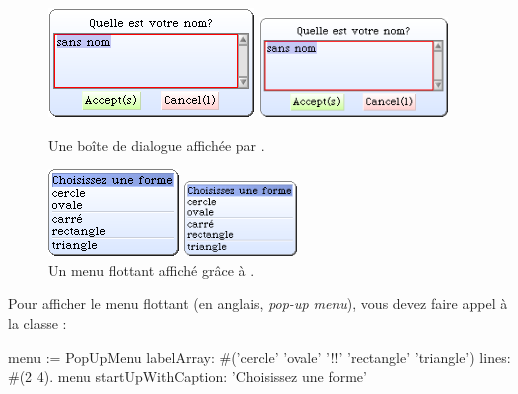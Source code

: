 \documentclass[a4paper,10pt,twoside]{book}
\begin{document}
\begin{figure}[htb]
\begin{minipage}{0.55\textwidth}
	\ifluluelse
		{\centerline{\includegraphics[scale=0.65]{dialog}}}
		{\centerline{\includegraphics[width=5cm]{dialog}}}
	\caption{Une boîte de dialogue affichée par
      .
		\label{fig:dialogName}}
\end{minipage}
\hfill
\begin{minipage}{0.38\textwidth}
	\vfill
	\ifluluelse
		{\centerline{\includegraphics [scale=0.65]{popup}}}
		{\centerline{\includegraphics[width=3cm]{popup}}}
	\vfill
	\vspace{4ex}
	\caption{Un menu flottant affiché grâce \`a .}
\end{minipage}
\end{figure}


Pour afficher le menu flottant (en anglais, \emph{pop-up menu}), vous
devez faire appel \`a la classe :
\begin{code}{}
menu := PopUpMenu
	labelArray: #('cercle' 'ovale' '!!' 'rectangle' 'triangle')
	lines: #(2 4).
menu startUpWithCaption: 'Choisissez une forme'
\end{code}
\end{document}
